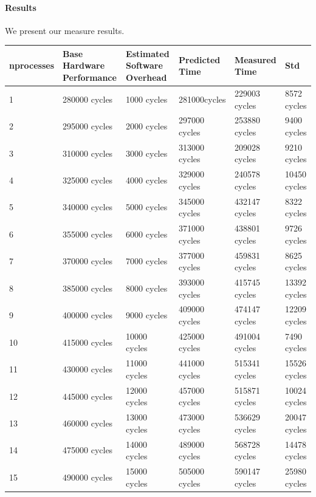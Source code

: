 \paragraph{Results}
We present our measure results.

\begin{center}
\begin{tabular}{| p{2cm} | p{2.5cm} | p{2.5cm} | p{2.5cm} | p{2.5cm} |  p{3cm}}
nprocesses   & Base Hardware Performance  & Estimated Software Overhead  & Predicted Time  & Measured Time  & Std \\
\hline
1 & 280000 cycles& 1000 cycles& 281000cycles & 229003 cycles & 8572 cycles \\
2 & 295000 cycles& 2000 cycles& 297000 cycles& 253880 cycles & 9400 cycles \\
3 & 310000 cycles& 3000 cycles& 313000 cycles& 209028 cycles & 9210 cycles \\
4 & 325000 cycles& 4000 cycles& 329000 cycles& 240578 cycles & 10450 cycles \\
5 & 340000 cycles& 5000 cycles& 345000 cycles& 432147 cycles & 8322 cycles \\
6 & 355000 cycles& 6000 cycles& 371000 cycles& 438801 cycles & 9726 cycles \\
7 & 370000 cycles& 7000 cycles& 377000 cycles& 459831 cycles & 8625 cycles \\
8 & 385000 cycles& 8000 cycles& 393000 cycles& 415745 cycles & 13392 cycles \\
9 & 400000 cycles& 9000 cycles& 409000 cycles& 474147 cycles & 12209 cycles \\
10 & 415000 cycles& 10000 cycles& 425000 cycles& 491004 cycles & 7490 cycles \\
11 & 430000 cycles& 11000 cycles& 441000 cycles& 515341 cycles & 15526 cycles \\
12 & 445000 cycles& 12000 cycles& 457000 cycles& 515871 cycles & 10024 cycles\\
13 & 460000 cycles& 13000 cycles& 473000 cycles& 536629 cycles & 20047 cycles \\
14 & 475000 cycles& 14000 cycles& 489000 cycles& 568728 cycles & 14478 cycles \\
15 & 490000 cycles& 15000 cycles& 505000 cycles& 590147 cycles & 25980 cycles \\

\end{tabular}
\end{center}

